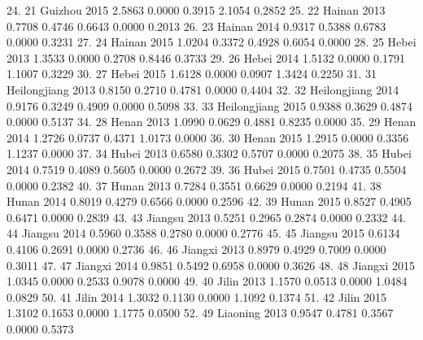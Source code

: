  24. {\VBAR}  21        Guizhou   2015   2.5863   0.0000   0.3915   2.1054   0.2852 {\VBAR}
 25. {\VBAR}  22         Hainan   2013   0.7708   0.4746   0.6643   0.0000   0.2013 {\VBAR}
 26. {\VBAR}  23         Hainan   2014   0.9317   0.5388   0.6783   0.0000   0.3231 {\VBAR}
 27. {\VBAR}  24         Hainan   2015   1.0204   0.3372   0.4928   0.6054   0.0000 {\VBAR}
 28. {\VBAR}  25          Hebei   2013   1.3533   0.0000   0.2708   0.8446   0.3733 {\VBAR}
 29. {\VBAR}  26          Hebei   2014   1.5132   0.0000   0.1791   1.1007   0.3229 {\VBAR}
 30. {\VBAR}  27          Hebei   2015   1.6128   0.0000   0.0907   1.3424   0.2250 {\VBAR}
 31. {\VBAR}  31   Heilongjiang   2013   0.8150   0.2710   0.4781   0.0000   0.4404 {\VBAR}
 32. {\VBAR}  32   Heilongjiang   2014   0.9176   0.3249   0.4909   0.0000   0.5098 {\VBAR}
 33. {\VBAR}  33   Heilongjiang   2015   0.9388   0.3629   0.4874   0.0000   0.5137 {\VBAR}
 34. {\VBAR}  28          Henan   2013   1.0990   0.0629   0.4881   0.8235   0.0000 {\VBAR}
 35. {\VBAR}  29          Henan   2014   1.2726   0.0737   0.4371   1.0173   0.0000 {\VBAR}
 36. {\VBAR}  30          Henan   2015   1.2915   0.0000   0.3356   1.1237   0.0000 {\VBAR}
 37. {\VBAR}  34          Hubei   2013   0.6580   0.3302   0.5707   0.0000   0.2075 {\VBAR}
 38. {\VBAR}  35          Hubei   2014   0.7519   0.4089   0.5605   0.0000   0.2672 {\VBAR}
 39. {\VBAR}  36          Hubei   2015   0.7501   0.4735   0.5504   0.0000   0.2382 {\VBAR}
 40. {\VBAR}  37          Hunan   2013   0.7284   0.3551   0.6629   0.0000   0.2194 {\VBAR}
 41. {\VBAR}  38          Hunan   2014   0.8019   0.4279   0.6566   0.0000   0.2596 {\VBAR}
 42. {\VBAR}  39          Hunan   2015   0.8527   0.4905   0.6471   0.0000   0.2839 {\VBAR}
 43. {\VBAR}  43        Jiangsu   2013   0.5251   0.2965   0.2874   0.0000   0.2332 {\VBAR}
 44. {\VBAR}  44        Jiangsu   2014   0.5960   0.3588   0.2780   0.0000   0.2776 {\VBAR}
 45. {\VBAR}  45        Jiangsu   2015   0.6134   0.4106   0.2691   0.0000   0.2736 {\VBAR}
 46. {\VBAR}  46        Jiangxi   2013   0.8979   0.4929   0.7009   0.0000   0.3011 {\VBAR}
 47. {\VBAR}  47        Jiangxi   2014   0.9851   0.5492   0.6958   0.0000   0.3626 {\VBAR}
 48. {\VBAR}  48        Jiangxi   2015   1.0345   0.0000   0.2533   0.9078   0.0000 {\VBAR}
 49. {\VBAR}  40          Jilin   2013   1.1570   0.0513   0.0000   1.0484   0.0829 {\VBAR}
 50. {\VBAR}  41          Jilin   2014   1.3032   0.1130   0.0000   1.1092   0.1374 {\VBAR}
 51. {\VBAR}  42          Jilin   2015   1.3102   0.1653   0.0000   1.1775   0.0500 {\VBAR}
 52. {\VBAR}  49       Liaoning   2013   0.9547   0.4781   0.3567   0.0000   0.5373 {\VBAR}
